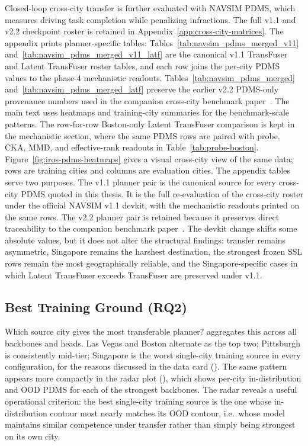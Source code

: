 Closed-loop cross-city transfer is further evaluated with NAVSIM PDMS, which measures driving task completion while penalizing infractions. The full v1.1 and v2.2 checkpoint roster is retained in Appendix~\ref{app:cross-city-matrices}. The appendix prints planner-specific tables: Tables~\ref{tab:navsim_pdms_merged_v11} and~\ref{tab:navsim_pdms_merged_v11_latf} are the canonical v1.1 TransFuser and Latent TransFuser roster tables, and each row joins the per-city PDMS values to the phase-4 mechanistic readouts. Tables~\ref{tab:navsim_pdms_merged} and~\ref{tab:navsim_pdms_merged_latf} preserve the earlier v2.2 PDMS-only provenance numbers used in the companion cross-city benchmark paper~\cite{naeinian-cross-city-2026}. The main text uses heatmaps and training-city summaries for the benchmark-scale patterns. The row-for-row Boston-only Latent TransFuser comparison is kept in the mechanistic section, where the same PDMS rows are paired with probe, CKA, MMD, and effective-rank readouts in Table~\ref{tab:probe-boston}. Figure~\ref{fig:iros-pdms-heatmaps} gives a visual cross-city view of the same data; rows are training cities and columns are evaluation cities.
\noindent
The appendix tables serve two purposes. The v1.1 planner pair is the canonical source for every cross-city PDMS quoted in this thesis. It is the full re-evaluation of the cross-city roster under the official NAVSIM v1.1 devkit, with the mechanistic readouts printed on the same rows. The v2.2 planner pair is retained because it preserves direct traceability to the companion benchmark paper~\cite{naeinian-cross-city-2026}. The devkit change shifts some absolute values, but it does not alter the structural findings: transfer remains asymmetric, Singapore remains the harshest destination, the strongest frozen SSL rows remain the most geographically reliable, and the Singapore-specific cases in which Latent TransFuser exceeds TransFuser are preserved under v1.1.
\FloatBarrier

\subsection{Best Training Ground (RQ2)}
\label{sec:exp-phase1-best-training-city}

Which source city gives the most transferable planner?  aggregates this across all backbones and heads. Las Vegas and Boston alternate as the top two; Pittsburgh is consistently mid-tier; Singapore is the worst single-city training source in every configuration, for the reasons discussed in the data card (). The same pattern appears more compactly in the radar plot (), which shows per-city in-distribution and OOD PDMS for each of the strongest backbones. The radar reveals a useful operational criterion: the best single-city training source is the one whose in-distribution contour most nearly matches its OOD contour, i.e.\ whose model maintains similar competence under transfer rather than simply being strongest on its own city.

